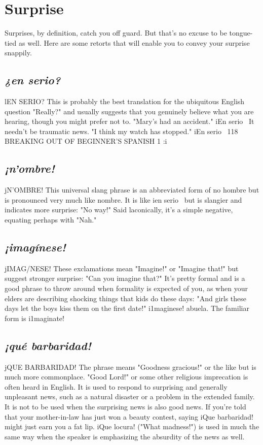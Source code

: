 \documentclass[14pt,a4paper,oneside]{memoir}
\begin{document}
\section{Surprise}

Surprises, by definition, catch you off guard. But that's no excuse to be tongue-tied as well. Here are some retorts that will enable
you to convey your surprise snappily.
\subsection{\emph{¿en serio?}}
lEN SERIO?
This is probably the best translation for the ubiquitous English
question "Really?" and usually suggests that you genuinely believe
what you are hearing, though you might prefer not to. "Mary's had an
accident." iEn serio~ It needn't be traumatic news. "I think my watch
has stopped." iEn serio~
118 BREAKING OUT OF BEGINNER'S SPANISH 1
:i
\subsection{\emph{¡n'ombre!}}
jN'OMBRE!
This universal slang phrase is an abbreviated form of no hombre but is pronounced very much like nombre. It is like ien serio~ but
is slangier and indicates more surprise: "No way!" Said laconically, it's
a simple negative, equating perhaps with "Nah."
\subsection{\emph{¡imagínese!}}
jIMAG/NESE!
These exclamations mean "Imagine!" or "Imagine that!" but
suggest stronger surprise: "Can you imagine that?" It's pretty formal
and is a good phrase to throw around when formality is expected of
you, as when your elders are describing shocking things that kids do
these days: "And girls these days let the boys kiss them on the first
date!" i1maginese! abuela. The familiar form is i1maginate!
\subsection{\emph{¡qué barbaridad!}}
jQUE BARBARIDAD!
The phrase means "Goodness gracious!" or the like but is
much more commonplace. "Good Lord!" or some other religious imprecation is often heard in English. It is used to respond to surprising
and generally unpleasant news, such as a natural disaster or a problem
in the extended family. It is not to be used when the surprising news is
also good news. If you're told that your mother-in-law has just won a
beauty contest, saying iQue barbaridad! might just earn you a fat lip.
iQue locura! ("What madness!") is used in much the same way when
the speaker is emphasizing the absurdity of the news as well.
\end{document}
